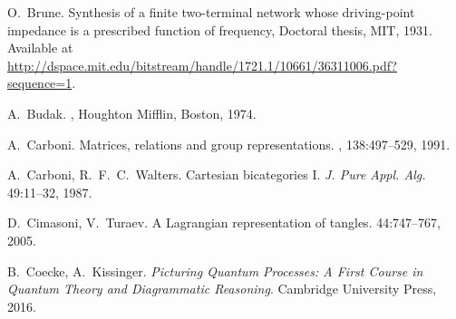 \begin{thebibliography}{RSW00}
    O.\ Brune.
    \newblock Synthesis of a finite two-terminal network whose
    driving-point impedance is a prescribed function of frequency, Doctoral
    thesis, MIT, 1931.
    \newblock Available at
    \href{http://dspace.mit.edu/bitstream/handle/1721.1/10661/36311006.pdf?sequence=1}
    {http://dspace.mit.edu/bitstream/handle/1721.1/10661/36311006.pdf? sequence=1}.

%

    A.\ Budak.
    , Houghton Mifflin, Boston, 1974.




    A.\ Carboni.
    \newblock Matrices, relations and group representations.
    , 138:497--529, 1991.

    A.\ Carboni, R.\ F.\ C.\ Walters.
    \newblock Cartesian bicategories I.
    \newblock \textsl{J. Pure Appl. Alg.} { 49}:11--32, 1987. 

    D.\ Cimasoni, V.\ Turaev.
    \newblock A Lagrangian representation of tangles.
     { 44}:747--767, 2005. 
    
    
    
    B.\ Coecke, A.\ Kissinger.
    \newblock \textsl{Picturing Quantum Processes: A First Course in Quantum Theory and Diagrammatic Reasoning}.
    \newblock Cambridge University Press, 2016.


\end{thebibliography}
